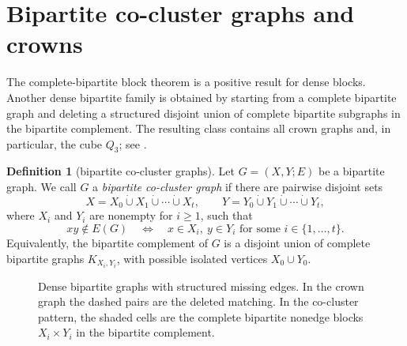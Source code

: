 \documentclass[11pt]{article}
\theoremstyle{definition}
\newtheorem{definition}[theorem]{Definition}
\begin{document}
\section{Bipartite co-cluster graphs and crowns}\label{sec:cocluster}

The complete-bipartite block theorem is a positive result for dense blocks.  Another dense bipartite family is obtained by starting from a complete bipartite graph and deleting a structured disjoint union of complete bipartite subgraphs in the bipartite complement.  The resulting class contains all crown graphs and, in particular, the cube $Q_3$; see .

\begin{definition}[bipartite co-cluster graphs]
Let $G=(X,Y;E)$ be a bipartite graph.  We call $G$ a \emph{bipartite co-cluster graph} if there are pairwise disjoint sets
\[
 X=X_0\dot\cup X_1\dot\cup\cdots\dot\cup X_t,
 \qquad
 Y=Y_0\dot\cup Y_1\dot\cup\cdots\dot\cup Y_t,
\]
where $X_i$ and $Y_i$ are nonempty for $i\ge1$, such that
\[
 xy\notin E(G)
 \quad\Longleftrightarrow\quad
 x\in X_i,\ y\in Y_i\text{ for some }i\in\{1,\ldots,t\}.
\]
Equivalently, the bipartite complement of $G$ is a disjoint union of complete bipartite graphs $K_{X_i,Y_i}$, with possible isolated vertices $X_0\cup Y_0$.

\end{definition}

\begin{figure}[H]
\centering
{}
\caption{Dense bipartite graphs with structured missing edges.  In the crown graph the dashed pairs are the deleted matching.  In the co-cluster pattern, the shaded cells are the complete bipartite nonedge blocks $X_i\times Y_i$ in the bipartite complement.}
\label{fig:crowns-coclusters}
\end{figure}
\end{document}
